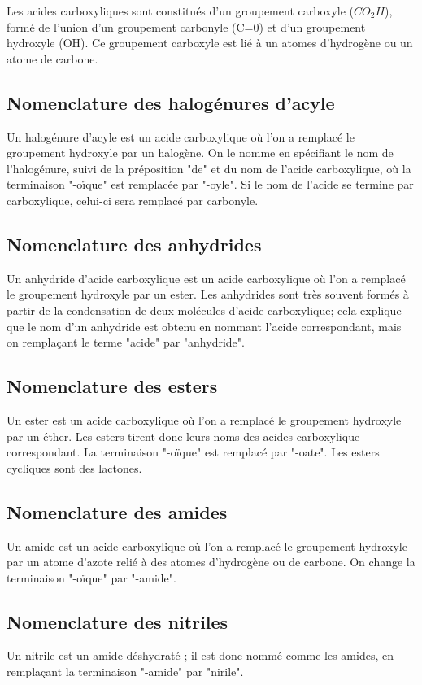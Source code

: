 Les acides carboxyliques sont constitués d'un groupement carboxyle ($CO_2H$), formé de l'union d'un groupement carbonyle (C=0) et d'un groupement hydroxyle (OH).
Ce groupement carboxyle est lié à un atomes d'hydrogène ou  un atome de carbone.

\subsection{Nomenclature des halogénures d'acyle}
Un halogénure d'acyle est un acide carboxylique où l'on a remplacé le groupement hydroxyle par un halogène.
On le nomme en spécifiant le nom de l'halogénure, suivi de la préposition "de" et du nom de l'acide carboxylique, où la terminaison "-oïque" est remplacée par "-oyle".
Si le nom de l'acide se termine par carboxylique, celui-ci sera remplacé par carbonyle.

\subsection{Nomenclature des anhydrides}
Un anhydride d'acide carboxylique est un acide carboxylique où l'on a remplacé le groupement hydroxyle par un ester.
Les anhydrides sont très souvent formés à partir de la condensation de deux molécules d'acide carboxylique; cela explique que le nom d'un anhydride est obtenu en nommant l'acide correspondant, mais on remplaçant le terme "acide" par "anhydride".

\subsection{Nomenclature des esters}

Un ester est un acide carboxylique où l'on a remplacé le groupement hydroxyle par un éther.
Les esters tirent donc leurs noms des acides carboxylique correspondant.
La terminaison "-oïque" est remplacé par "-oate".
Les esters cycliques sont des lactones.

\subsection{Nomenclature des amides}

Un amide est un acide carboxylique où l'on a remplacé le groupement hydroxyle par un atome d'azote relié à des atomes d'hydrogène ou de carbone.
On change la terminaison "-oïque" par "-amide".

\subsection{Nomenclature des nitriles}
Un nitrile est un amide déshydraté ; il est donc nommé comme les amides, en remplaçant la terminaison "-amide" par "nirile".

